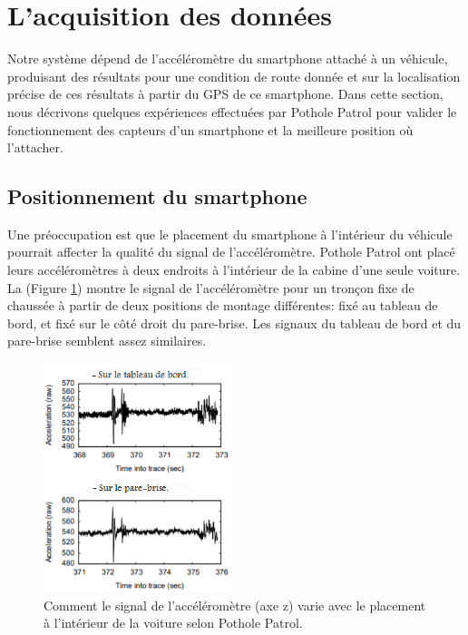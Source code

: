 

\newpage
\section{L'acquisition des données}
Notre système dépend de l'accéléromètre du smartphone attaché à un véhicule, produisant des résultats pour une condition de route donnée et sur la localisation précise de ces résultats à partir du GPS de ce smartphone.
Dans cette section, nous décrivons quelques expériences effectuées par Pothole Patrol \cite{erikssonPotholePatrolUsing2008a} pour valider le fonctionnement des capteurs d'un smartphone et la meilleure position où l'attacher.

\subsection{Positionnement du smartphone}
Une préoccupation est que le placement du smartphone à l'intérieur du véhicule pourrait affecter la qualité du signal de l'accéléromètre. Pothole Patrol ont placé leurs accéléromètres à deux endroits à l'intérieur de la cabine d'une seule voiture. La (Figure \ref{fig:smartphonePosition}) montre le signal de l'accéléromètre pour un tronçon fixe de chaussée à partir de deux positions de montage différentes: fixé au tableau de bord, et fixé sur le côté droit du pare-brise. Les signaux du tableau de bord et du pare-brise semblent assez similaires. 

\begin{figure}[h!]
  \center
  \includegraphics[width=0.50\textwidth]{Images/chapter2/positionmnt.PNG}
  \caption{Comment le signal de l'accéléromètre (axe z) varie avec le placement à l'intérieur de la voiture selon Pothole Patrol.}
  \label{fig:smartphonePosition}
\end{figure}

